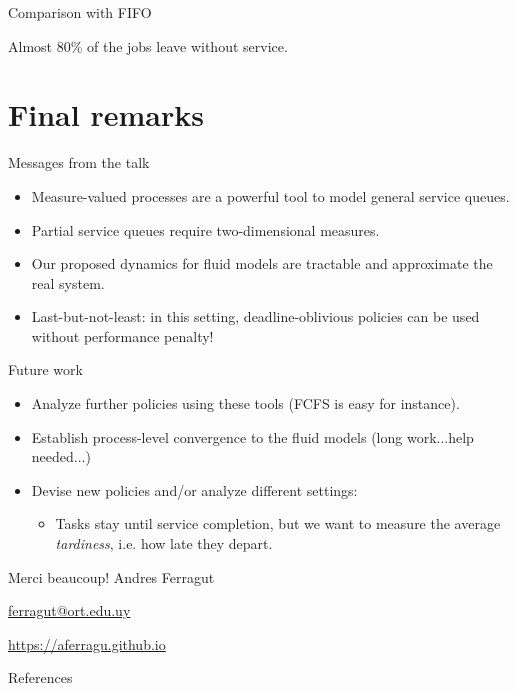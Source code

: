 \documentclass[aspectratio=169]{beamer}
\newenvironment*{myitem}[1][1.5em]{\begin{itemize}\setlength{\itemsep}{#1}}{\end{itemize}}
\begin{document}
\begin{frame}{Comparison with FIFO}

	\begin{center}
	
	\end{center}

	\vfill

	Almost 80\% of the jobs leave without service.
\end{frame}

\section{Final remarks}

\begin{frame}{Messages from the talk}
	
	\begin{myitem}
		\item Measure-valued processes are a powerful tool to model general service queues.
		\item Partial service queues require two-dimensional measures.
		\item Our proposed dynamics for fluid models are tractable and approximate the real system.
		\item Last-but-not-least: in this setting, \alert{deadline-oblivious} policies can be used without performance penalty!
	\end{myitem}
\end{frame}

\begin{frame}{Future work}
	
	\begin{myitem}
		\item Analyze further policies using these tools (FCFS is easy for instance).
		\item Establish process-level convergence to the fluid models (long work...help needed...)
		\item Devise new policies and/or analyze different settings:
		
		\begin{itemize}
			\item Tasks stay until service completion, but we want to measure the average \emph{tardiness}, i.e. how late they depart.
		\end{itemize}
	\end{myitem}
\end{frame}


\begin{frame}[plain]
	\vfill
	{\Huge \alert{Merci beaucoup!}}
	\vfill
	Andres Ferragut

	\smallskip

	\href{mailto://ferragut@ort.edu.uy}{\alert{ferragut@ort.edu.uy}}
	
	\smallskip

	\href{http://aferragu.github.io}{\alert{https://aferragu.github.io}}
\end{frame}

\begin{frame}[allowframebreaks]{References}
	
\end{frame}
\end{document}
